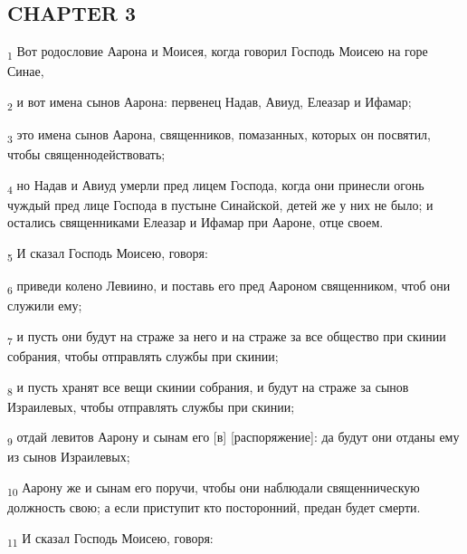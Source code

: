 \subsection{CHAPTER 3}
\begin{tcolorbox}
\textsubscript{1} Вот родословие Аарона и Моисея, когда говорил Господь Моисею на горе Синае,
\end{tcolorbox}
\begin{tcolorbox}
\textsubscript{2} и вот имена сынов Аарона: первенец Надав, Авиуд, Елеазар и Ифамар;
\end{tcolorbox}
\begin{tcolorbox}
\textsubscript{3} это имена сынов Аарона, священников, помазанных, которых он посвятил, чтобы священнодействовать;
\end{tcolorbox}
\begin{tcolorbox}
\textsubscript{4} но Надав и Авиуд умерли пред лицем Господа, когда они принесли огонь чуждый пред лице Господа в пустыне Синайской, детей же у них не было; и остались священниками Елеазар и Ифамар при Аароне, отце своем.
\end{tcolorbox}
\begin{tcolorbox}
\textsubscript{5} И сказал Господь Моисею, говоря:
\end{tcolorbox}
\begin{tcolorbox}
\textsubscript{6} приведи колено Левиино, и поставь его пред Аароном священником, чтоб они служили ему;
\end{tcolorbox}
\begin{tcolorbox}
\textsubscript{7} и пусть они будут на страже за него и на страже за все общество при скинии собрания, чтобы отправлять службы при скинии;
\end{tcolorbox}
\begin{tcolorbox}
\textsubscript{8} и пусть хранят все вещи скинии собрания, и будут на страже за сынов Израилевых, чтобы отправлять службы при скинии;
\end{tcolorbox}
\begin{tcolorbox}
\textsubscript{9} отдай левитов Аарону и сынам его [в] [распоряжение]: да будут они отданы ему из сынов Израилевых;
\end{tcolorbox}
\begin{tcolorbox}
\textsubscript{10} Аарону же и сынам его поручи, чтобы они наблюдали священническую должность свою; а если приступит кто посторонний, предан будет смерти.
\end{tcolorbox}
\begin{tcolorbox}
\textsubscript{11} И сказал Господь Моисею, говоря:
\end{tcolorbox}
